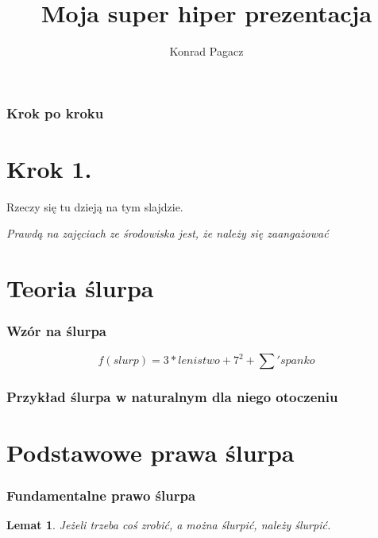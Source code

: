 \documentclass[12pt]{beamer}
\author{Konrad Pagacz}
\date{}
\title{Moja super hiper prezentacja}
\newtheorem{lm}{Lemat}
\begin{document}
\begin{frame}
\titlepage 
\end{frame}

\begin{frame}
    \frametitle {Krok po kroku}
    \tableofcontents
\end{frame}

\section{Krok 1.}
\begin{frame}
Rzeczy się tu dzieją na tym slajdzie.
\vspace{2cm}

\textit {Prawdą na zajęciach ze środowiska jest, że należy się zaangażować}
\end{frame}

\section{Teoria ślurpa}
\begin{frame}
    \frametitle{Wzór na ślurpa}
\begin{displaymath}
f(slurp) = 3*lenistwo + 7^2 + {\sum}' spanko
\end{displaymath}
\end{frame}

\begin{frame}
    \frametitle{Przykład ślurpa w naturalnym dla niego otoczeniu}
\end{frame}

\section{Podstawowe prawa ślurpa}
\begin{frame}
    \frametitle{Fundamentalne prawo ślurpa}
    \begin{lm}
        Jeżeli trzeba coś zrobić, a można ślurpić, należy ślurpić.
    \end{lm}
\end{frame}
\end{document}

